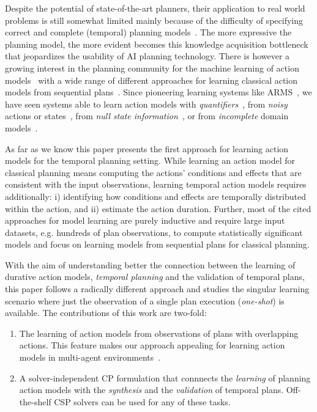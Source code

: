 \documentclass{ecai}
\begin{document}
Despite the potential of state-of-the-art planners, their application to real world problems is still somewhat limited mainly because of the difficulty of specifying correct and complete (temporal) planning models~\cite{kambhampati2007model}. The more expressive the planning model, the more evident becomes this knowledge acquisition bottleneck that jeopardizes the usability of AI planning technology. There is however a growing interest in the planning community for the machine learning of action models~\cite{kuvcera2018louga,MouraoZPS12,yang2007learning,zhuo2013action} with a wide range of different approaches for learning classical action models from sequential plans~\cite{arora2018review}. Since pioneering learning systems like ARMS~\cite{yang2007learning}, we have seen systems able to learn action models with {\em quantifiers}~\cite{AmirC08,ZhuoYHL10}, from {\em noisy} actions or states~\cite{MouraoZPS12,zhuo2013action}, from {\em null state information}~\cite{cresswell2013}, or from {\em incomplete} domain models~\cite{ZhuoK17,ZhuoNK13}.

As far as we know this paper presents the first approach for learning action models for the temporal planning setting. While learning an action model for classical planning means computing the actions' conditions and effects that are consistent with the input observations, learning temporal action models requires additionally: i) identifying how conditions and effects are temporally distributed within the action, and ii) estimate the action duration. Further, most of the cited approaches for model learning are purely inductive and require large input datasets, e.g. hundreds of plan observations, to compute statistically significant models and focus on learning models from sequential plans for classical planning.

With the aim of understanding better the connection between the learning of durative action models, {\em temporal planning}  and the validation of temporal plans, this paper follows a radically different approach and studies the singular learning scenario where just the observation of a single plan execution ({\em one-shot}) is available. The contributions of this work are two-fold:

\begin{enumerate}  
\item The learning of action models from observations of plans with overlapping actions. This feature makes our approach appealing for learning action models in multi-agent environments~\cite{furelos2018carpool}. 
\item A solver-independent CP formulation that connnects the {\em learning} of planning action models with the {\em synthesis} and the {\em validation} of temporal plans. Off-the-shelf CSP solvers can be used for any of these tasks.  
\end{enumerate}
\end{document}
